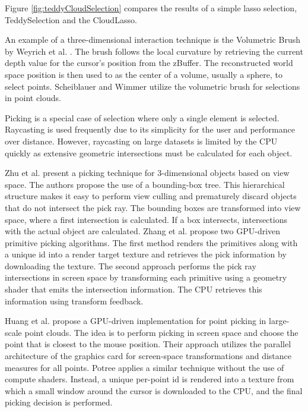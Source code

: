 Figure \ref{fig:teddyCloudSelection} compares the results of a simple lasso selection, TeddySelection and the CloudLasso. 

\par

An example of a three-dimensional interaction technique is the Volumetric Brush by Weyrich et al. \cite{weyrich2004post}. The brush follows the local curvature by retrieving the current depth value for the cursor's position from the zBuffer. The reconstructed world space position is then used to as the center of a volume, usually a sphere, to select points. Scheiblauer and Wimmer \cite{scheiblauer2011out} utilize the volumetric brush for selections in point clouds. 

\par

Picking is a special case of selection where only a single element is selected. Raycasting is used frequently due to its simplicity for the user and performance over distance. However, raycasting on large datasets is limited by the CPU quickly as extensive geometric intersections must be calculated for each object. 

\par

Zhu et al. \cite{zhu2008algorithm} present a picking technique for 3-dimensional objects based on view space. The authors propose the use of a bounding-box tree. This hierarchical structure makes it easy to perform view culling and prematurely discard objects that do not intersect the pick ray. The bounding boxes are transformed into view space, where a first intersection is calculated. If a box intersects, intersections with the actual object are calculated. 
Zhang et al. \cite{zhang20093d} propose two GPU-driven primitive picking algorithms. The first method renders the primitives along with a unique id into a render target texture and retrieves the pick information by downloading the texture. The second approach performs the pick ray intersections in screen space by transforming each primitive using a geometry shader that emits the intersection information. The CPU retrieves this information using transform feedback.

\par

Huang et al. \cite{huang2014pickup} propose a GPU-driven implementation for point picking in large-scale point clouds. The idea is to perform picking in screen space and choose the point that is closest to the mouse position. Their approach utilizes the parallel architecture of the graphics card for screen-space transformations and distance measures for all points. Potree \cite{SCHUETZ-2016-POT} applies a similar technique without the use of compute shaders. Instead, a unique per-point id is rendered into a texture from which a small window around the cursor is downloaded to the CPU, and the final picking decision is performed.  
